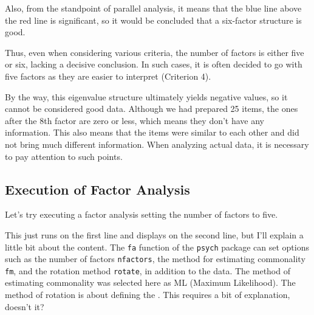 \documentclass{ltjsbook}
\begin{document}
Also, from the standpoint of parallel analysis, it means that the blue line above the red line is significant, so it would be concluded that a six-factor structure is good.

Thus, even when considering various criteria, the number of factors is either five or six, lacking a decisive conclusion. In such cases, it is often decided to go with five factors as they are easier to interpret (Criterion 4).

By the way, this eigenvalue structure ultimately yields negative values, so it cannot be considered good data. Although we had prepared 25 items, the ones after the 8th factor are zero or less, which means they don't have any information. This also means that the items were similar to each other and did not bring much different information. When analyzing actual data, it is necessary to pay attention to such points.

\subsection{Execution of Factor Analysis}
Let's try executing a factor analysis setting the number of factors to five.



This just runs on the first line and displays on the second line, but I'll explain a little bit about the content.
The \texttt{fa} function of the \texttt{psych} package can set options such as the number of factors \texttt{nfactors}, the method for estimating commonality \texttt{fm}, and the rotation method \texttt{rotate}, in addition to the data.
The method of estimating commonality was selected here as ML (Maximum Likelihood).
The method of rotation is about defining the . This requires a bit of explanation, doesn't it?
\end{document}
